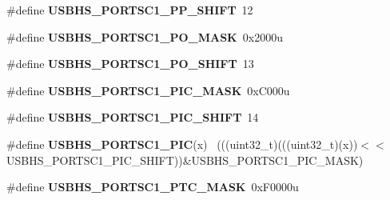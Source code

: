 \begin{DoxyCompactItemize}
\item 
\hypertarget{group___u_s_b_h_s___register___masks_ga31d33c77bb2849ee5044ff0a6f8eb13c}{}\#define {\bfseries U\+S\+B\+H\+S\+\_\+\+P\+O\+R\+T\+S\+C1\+\_\+\+P\+P\+\_\+\+S\+H\+I\+F\+T}~12\label{group___u_s_b_h_s___register___masks_ga31d33c77bb2849ee5044ff0a6f8eb13c}

\item 
\hypertarget{group___u_s_b_h_s___register___masks_ga2021be9a9f5863bab521cbb02f0ed94c}{}\#define {\bfseries U\+S\+B\+H\+S\+\_\+\+P\+O\+R\+T\+S\+C1\+\_\+\+P\+O\+\_\+\+M\+A\+S\+K}~0x2000u\label{group___u_s_b_h_s___register___masks_ga2021be9a9f5863bab521cbb02f0ed94c}

\item 
\hypertarget{group___u_s_b_h_s___register___masks_ga81feac31e7f085fd705337dd178d743d}{}\#define {\bfseries U\+S\+B\+H\+S\+\_\+\+P\+O\+R\+T\+S\+C1\+\_\+\+P\+O\+\_\+\+S\+H\+I\+F\+T}~13\label{group___u_s_b_h_s___register___masks_ga81feac31e7f085fd705337dd178d743d}

\item 
\hypertarget{group___u_s_b_h_s___register___masks_ga9e6af4cd1747ea91cd6c7908ec1d78ef}{}\#define {\bfseries U\+S\+B\+H\+S\+\_\+\+P\+O\+R\+T\+S\+C1\+\_\+\+P\+I\+C\+\_\+\+M\+A\+S\+K}~0x\+C000u\label{group___u_s_b_h_s___register___masks_ga9e6af4cd1747ea91cd6c7908ec1d78ef}

\item 
\hypertarget{group___u_s_b_h_s___register___masks_gad2c2829b14d53b5887617ff02e63131d}{}\#define {\bfseries U\+S\+B\+H\+S\+\_\+\+P\+O\+R\+T\+S\+C1\+\_\+\+P\+I\+C\+\_\+\+S\+H\+I\+F\+T}~14\label{group___u_s_b_h_s___register___masks_gad2c2829b14d53b5887617ff02e63131d}

\item 
\hypertarget{group___u_s_b_h_s___register___masks_ga2df10a5e379a227bd380d92bc9f2c561}{}\#define {\bfseries U\+S\+B\+H\+S\+\_\+\+P\+O\+R\+T\+S\+C1\+\_\+\+P\+I\+C}(x)                                      ~(((uint32\+\_\+t)(((uint32\+\_\+t)(x))$<$$<$U\+S\+B\+H\+S\+\_\+\+P\+O\+R\+T\+S\+C1\+\_\+\+P\+I\+C\+\_\+\+S\+H\+I\+F\+T))\&U\+S\+B\+H\+S\+\_\+\+P\+O\+R\+T\+S\+C1\+\_\+\+P\+I\+C\+\_\+\+M\+A\+S\+K)\label{group___u_s_b_h_s___register___masks_ga2df10a5e379a227bd380d92bc9f2c561}

\item 
\hypertarget{group___u_s_b_h_s___register___masks_ga0cd2158d15b6dfdddb16dcc3326b4689}{}\#define {\bfseries U\+S\+B\+H\+S\+\_\+\+P\+O\+R\+T\+S\+C1\+\_\+\+P\+T\+C\+\_\+\+M\+A\+S\+K}~0x\+F0000u\label{group___u_s_b_h_s___register___masks_ga0cd2158d15b6dfdddb16dcc3326b4689}


\end{DoxyCompactItemize}
